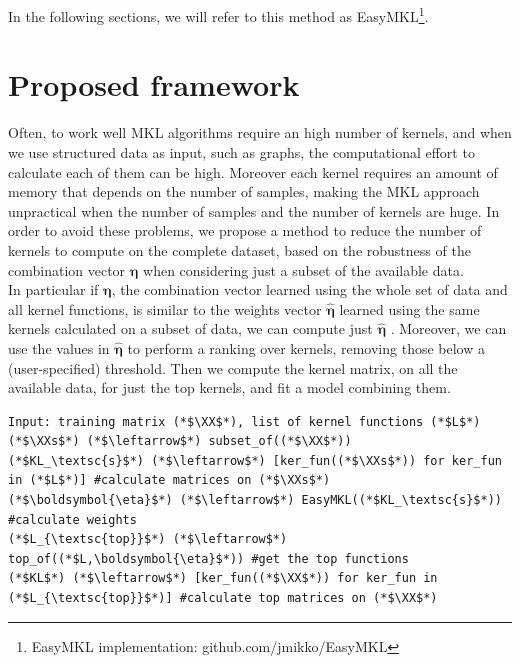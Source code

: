 \documentclass{esannV2}
\newcommand{\yy}{{\bf y}}
\newcommand{\KK}{{\bf K}}
\newcommand{\YY}{{\bf Y}}
\newcommand{\XX}{{\bf X}}
\newcommand{\XXs}{{\XX_\textsc{s}}}
\newcommand{\1}{{\bf 1}}
\begin{document}
In the following sections, we will refer to this method as EasyMKL\footnote{EasyMKL implementation: github.com/jmikko/EasyMKL}.


\section{Proposed framework}
Often, to work well MKL algorithms require an high number of kernels, and when we use structured data as input, such as graphs, the computational effort to calculate each of them can be high. Moreover each kernel requires an amount of memory that depends on the number of samples, making the MKL approach unpractical when the number of samples and the number of kernels are huge.
In order to avoid these problems, we propose a method to reduce the number of kernels to compute on the complete dataset, based on the robustness of the combination vector $\boldsymbol{\eta}$ when considering just a subset of the available data.\\
In particular if $\boldsymbol{\eta}$, the combination vector learned using the whole set of data and all kernel functions, is similar to the weights vector $\hat{\boldsymbol{\eta}}$ learned using the same kernels calculated on a subset of data, we can compute just $\hat{\boldsymbol{\eta}}$ .
Moreover, we can use the values in $\hat{\boldsymbol{\eta}}$ to perform a ranking over kernels, removing those below a (user-specified) threshold.
Then we compute the kernel matrix, on all the available data, for just the top kernels, and fit a model combining them.



\begin{lstlisting}
Input: training matrix (*$\XX$*), list of kernel functions (*$L$*)
(*$\XXs$*) (*$\leftarrow$*) subset_of((*$\XX$*))
(*$KL_\textsc{s}$*) (*$\leftarrow$*) [ker_fun((*$\XXs$*)) for ker_fun in (*$L$*)] #calculate matrices on (*$\XXs$*)
(*$\boldsymbol{\eta}$*) (*$\leftarrow$*) EasyMKL((*$KL_\textsc{s}$*)) #calculate weights
(*$L_{\textsc{top}}$*) (*$\leftarrow$*) top_of((*$L,\boldsymbol{\eta}$*)) #get the top functions
(*$KL$*) (*$\leftarrow$*) [ker_fun((*$\XX$*)) for ker_fun in (*$L_{\textsc{top}}$*)] #calculate top matrices on (*$\XX$*)
\end{lstlisting}
\end{document}
